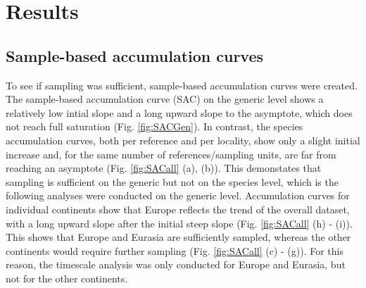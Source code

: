 \section{Results}


\subsection{Sample-based accumulation curves}
To see if sampling was sufficient, sample-based accumulation curves were created. The sample-based accumulation curve (SAC) on the generic level shows a relatively low intial slope and a long upward slope to the asymptote, which does not reach full saturation (Fig. \ref{fig:SACGen}).
In contrast, the species accumulation curves, both per reference and per locality, show only a slight initial increase and, for the same number of references/sampling units, are far from reaching an asymptote (Fig. \ref{fig:SACall} (a), (b)).
This demonstates that sampling is sufficient on the generic but not on the species level, which is the following analyses were conducted on the generic level. 
Accumulation curves for individual continents show that Europe reflects the trend of the overall dataset, with a long upward slope after the initial steep slope (Fig. \ref{fig:SACall} (h) - (i)). This shows that Europe and Eurasia are sufficiently sampled, whereas the other continents would require further sampling (Fig. \ref{fig:SACall} (c) - (g)). For this reason, the timescale analysis was only conducted for Europe and Eurasia, but not for the other continents.


